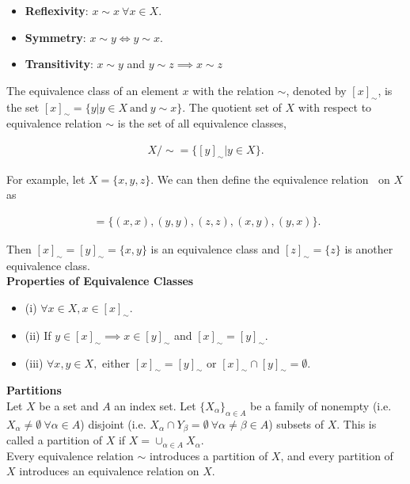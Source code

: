 \documentclass{article}
\numberwithin{theorem}{subsection}
\numberwithin{theorem}{subsubsection}
\numberwithin{lemma}{subsection}
\numberwithin{lemma}{subsubsection}
\theoremstyle{definition}
\numberwithin{definition}{subsection}
\numberwithin{definition}{subsubsection}
\begin{document}
\begin{itemize}
    \item \textbf{Reflexivity}: $x \sim x\ \forall x \in X$.
    \item \textbf{Symmetry}: $x \sim y \Leftrightarrow y \sim x$.
    \item \textbf{Transitivity}: $x \sim y$ and $y \sim z \implies x \sim z$
\end{itemize}

\noindent The equivalence class of an element $x$ with the relation $\sim$, denoted by $[x]_{\sim}$, is the set $[x]_{\sim} = \{y|y \in X\ \text{and}\ y \sim x\}$. The quotient set of $X$ with respect to equivalence relation $\sim$ is the set of all equivalence classes,

\begin{gather*}
    X/ \sim = \{[y]_{\sim}|y \in X\}.
\end{gather*}

\noindent For example, let $X = \{x,y,z\}$. We can then define the equivalence relation $~$ on $X$ as

\begin{gather*}
    ~= \{(x,x),(y,y),(z,z),(x,y),(y,x)\}.
\end{gather*}

\noindent Then $[x]_{\sim} = [y]_{\sim} = \{x,y\}$ is an equivalence class and $[z]_{\sim} = \{z\}$ is another equivalence class.
\\

\noindent \textbf{Properties of Equivalence Classes}
\begin{itemize}
    \item (i) $\forall x \in X, x \in [x]_{\sim}$.
    \item (ii) If $y \in [x]_{\sim} \implies x \in [y]_{\sim}$ and $[x]_{\sim} = [y]_{\sim}$.
    \item (iii) $\forall x, y \in X,$ either $[x]_{\sim} = [y]_{\sim}$ or $[x]_{\sim} \cap [y]_{\sim} = \emptyset$.\\
\end{itemize}

\noindent \textbf{Partitions}\\
\indent Let $X$ be a set and $A$ an index set. Let $\{X_{\alpha}\}_{\alpha \in A}$ be a family of nonempty (i.e. $X_{\alpha} \neq \emptyset\ \forall \alpha \in A$) disjoint (i.e. $X_{\alpha} \cap Y_{\beta} = \emptyset\ \forall \alpha \neq \beta \in A$) subsets of $X$. This is called a partition of $X$ if $X = \cup_{\alpha \in A}X_{\alpha}$.\\
\indent Every equivalence relation $\sim$ introduces a partition of $X$, and every partition of $X$ introduces an equivalence relation on $X$.
\end{document}
